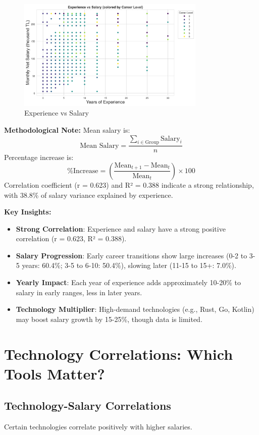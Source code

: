 \documentclass[12pt,a4paper]{article}
\begin{document}
\begin{figure}[H]
	\centering
	\includegraphics[width=0.8\textwidth]{figures/scatter_experience_salary.png}
	\caption{Experience vs Salary}
\end{figure}

\textbf{Methodological Note:}
Mean salary is:
\[
	\text{Mean Salary} = \frac{\sum_{i \in \text{Group}} \text{Salary}_i}{n}
\]
Percentage increase is:
\[
	\text{\% Increase} = \left( \frac{\text{Mean}_{t+1} - \text{Mean}_t}{\text{Mean}_t} \right) \times 100
\]
Correlation coefficient (r = 0.623) and R² = 0.388 indicate a strong relationship, with 38.8\% of salary variance explained by experience.

\textbf{Key Insights:}
\begin{itemize}
	\item \textbf{Strong Correlation}: Experience and salary have a strong positive correlation (r = 0.623, R² = 0.388).
	\item \textbf{Salary Progression}: Early career transitions show large increases (0-2 to 3-5 years: 60.4\%; 3-5 to 6-10: 50.4\%), slowing later (11-15 to 15+: 7.0\%).
	\item \textbf{Yearly Impact}: Each year of experience adds approximately 10-20\% to salary in early ranges, less in later years.
	\item \textbf{Technology Multiplier}: High-demand technologies (e.g., Rust, Go, Kotlin) may boost salary growth by 15-25\%, though data is limited.
\end{itemize}

\section{Technology Correlations: Which Tools Matter?}

\subsection{Technology-Salary Correlations}
Certain technologies correlate positively with higher salaries.
\end{document}
